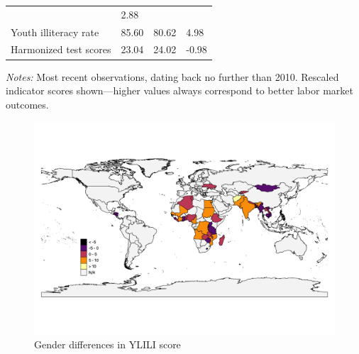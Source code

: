 \documentclass[
  a4paper, twoside, 12pt]{book}
\begin{document}
\begin{table}
\begin{threeparttable}
\begin{tabular}[t]{llll}
& 2.88\\
\addlinespace
\hspace{1em}Youth illiteracy rate & 85.60 & 80.62 & 4.98\\
\addlinespace
\hspace{1em}Harmonized test scores & 23.04 & 24.02 & -0.98\\
\bottomrule
\end{tabular}
\begin{tablenotes}
\item \textit{Notes:} Most recent observations, dating back no further than 2010. Rescaled indicator scores shown—higher values always correspond to better labor market outcomes.
\end{tablenotes}
\end{threeparttable}
\end{table}

\newpage



\begin{figure}[H]

{\centering \includegraphics[width=1\linewidth,]{figures/maps/diff_YLILI} 

}

\caption{Gender differences in YLILI score}\label{fig:fig-gendiff}
\end{figure}
\end{document}
